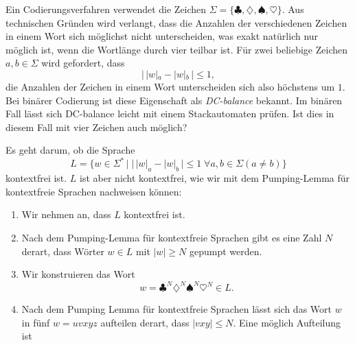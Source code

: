 Ein Codierungsverfahren verwendet die Zeichen
$\Sigma=\{
\clubsuit,
\diamondsuit,
\spadesuit,
\heartsuit
\}$.
Aus technischen Gründen wird verlangt, dass die Anzahlen der 
verschiedenen Zeichen in einem Wort sich möglichst nicht unterscheiden, was
exakt natürlich nur möglich ist, wenn die Wortlänge durch vier
teilbar ist.
Für zwei beliebige Zeichen $a,b\in\Sigma$ wird gefordert, dass
\[
|\, |w|_a - |w|_b\,|\le 1,
\]
die Anzahlen der Zeichen in einem Wort unterscheiden sich also höchstens
um $1$.
Bei binärer Codierung ist diese Eigenschaft
als {\em DC-balance} bekannt.
Im binären Fall lässt sich DC-balance leicht mit einem Stackautomaten
prüfen.
Ist dies in diesem Fall mit vier Zeichen auch möglich?


\begin{loesung}
Es geht darum, ob die Sprache
\[
L
=
\{w\in\Sigma^*\,|\;
|\, |w|_a - |w|_b\,|\le 1\;\forall a,b\in\Sigma(a\ne b)\}
\]
kontextfrei ist.
$L$ ist aber nicht kontextfrei, wie wir mit dem Pumping-Lemma für
kontextfreie Sprachen nachweisen können:
\begin{enumerate}
\item 
Wir nehmen an, dass $L$ kontextfrei ist.
\item
Nach dem Pumping-Lemma für kontextfreie Sprachen gibt es eine Zahl
$N$ derart, dass Wörter $w\in L$ mit $|w|\ge N$ gepumpt werden.
\item
Wir konstruieren das Wort
\[
w = 
\clubsuit^N
\diamondsuit^N
\spadesuit^N
\heartsuit^N
 \in
L.
\]
\item
Nach dem Pumping Lemma für kontextfreie Sprachen lässt sich das Wort $w$
in fünf $w=uvxyz$ aufteilen derart, dass $|vxy|\le N$.
Eine möglich Aufteilung ist
\begin{center}
\end{center}
\end{enumerate}
\end{loesung}
